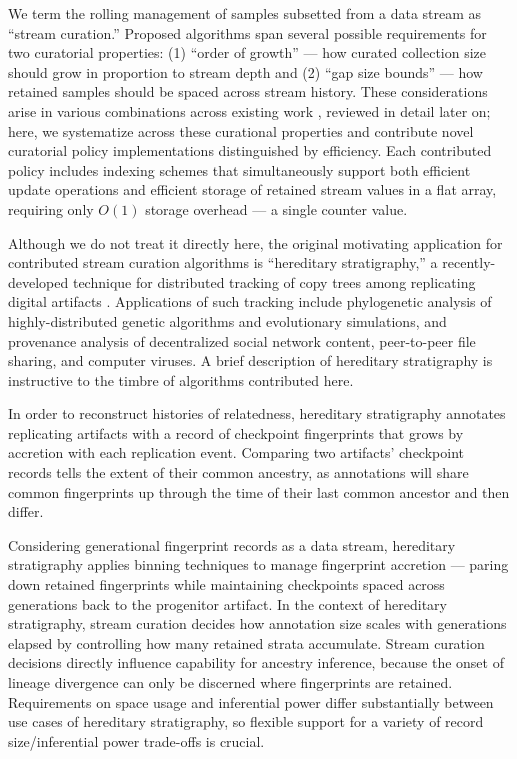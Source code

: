 We term the rolling management of samples subsetted from a data stream as ``stream curation.''
Proposed algorithms span several possible requirements for two curatorial properties: (1) ``order of growth'' --- how curated collection size should grow in proportion to stream depth and (2) ``gap size bounds'' --- how retained samples should be spaced across stream history.
These considerations arise in various combinations across existing work \citep{aggarwal2003framework,han2005stream}, reviewed in detail later on;
here, we systematize across these curational properties and contribute novel curatorial policy implementations distinguished by efficiency.
Each contributed policy includes indexing schemes that simultaneously support both efficient update operations and efficient storage of retained stream values in a flat array, requiring only $O(1)$ storage overhead --- a single counter value.

Although we do not treat it directly here, the original motivating application for contributed stream curation algorithms is ``hereditary stratigraphy,'' a recently-developed technique for distributed tracking of copy trees among replicating digital artifacts \citep{moreno2022hereditary}.
Applications of such tracking include phylogenetic analysis of highly-distributed genetic algorithms and evolutionary simulations, and provenance analysis of decentralized social network content, peer-to-peer file sharing, and computer viruses.
A brief description of hereditary stratigraphy is instructive to the timbre of algorithms contributed here.

In order to reconstruct histories of relatedness, hereditary stratigraphy annotates replicating artifacts with a record of checkpoint fingerprints that grows by accretion with each replication event.
Comparing two artifacts' checkpoint records tells the extent of their common ancestry, as annotations will share common fingerprints up through the time of their last common ancestor and then differ.

Considering generational fingerprint records as a data stream, hereditary stratigraphy applies binning techniques to manage fingerprint accretion --- paring down retained fingerprints while maintaining checkpoints spaced across generations back to the progenitor artifact.
In the context of hereditary stratigraphy, stream curation decides how annotation size scales with generations elapsed by controlling how many retained strata accumulate.
Stream curation decisions directly influence capability for ancestry inference, because the onset of lineage divergence can only be discerned where fingerprints are retained.
Requirements on space usage and inferential power differ substantially between use cases of hereditary stratigraphy, so flexible support for a variety of record size/inferential power trade-offs is crucial.

